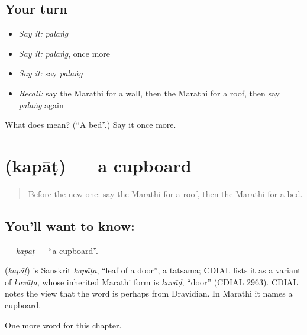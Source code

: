 \subsection*{Your turn}
\begin{itemize}
\raggedright
  \item \emph{Say it:} \emph{palaṅg}
  \item \emph{Say it:} \emph{palaṅg}, once more
  \item \emph{Say it:} say \emph{palaṅg}
  \item \emph{Recall:} say the Marathi for a wall, then the Marathi for a roof, then say \emph{palaṅg} again
\end{itemize}

\begin{tcolorbox}[breakable,colback=teal!4,colframe=teal!35!black,title={Before you move on}]
What does  mean? (\textquotedblleft{}A bed\textquotedblright{}.) Say it once more.
\end{tcolorbox}
\section[\texorpdfstring{\mr{कपाट} (kapāṭ)}{कपाट (kapāṭ)}]{ (kapāṭ) — a cupboard}

\label{lesson:MR-C90-kapat}



\begin{quote}
Before the new one: say the Marathi for a roof, then the Marathi for a bed.
\end{quote}

\subsection*{You'll want to know: }
\textbf{} — \emph{kapāṭ} — \textquotedblleft{}a cupboard\textquotedblright{}.

\begin{cousinweb}
\textbf{} (\emph{kapāṭ}) is Sanskrit \emph{kapāṭa}, \textquotedblleft{}leaf of a door\textquotedblright{}, a tatsama; CDIAL lists it as a variant of \emph{kavāṭa}, whose inherited Marathi form is \emph{kavāḍ}, \textquotedblleft{}door\textquotedblright{} (CDIAL 2963). CDIAL notes the view that the word is perhaps from Dravidian. In Marathi it names a cupboard.
\end{cousinweb}

\begin{grammarlens}[title={What you've built}]
One more word for this chapter.
\end{grammarlens}

